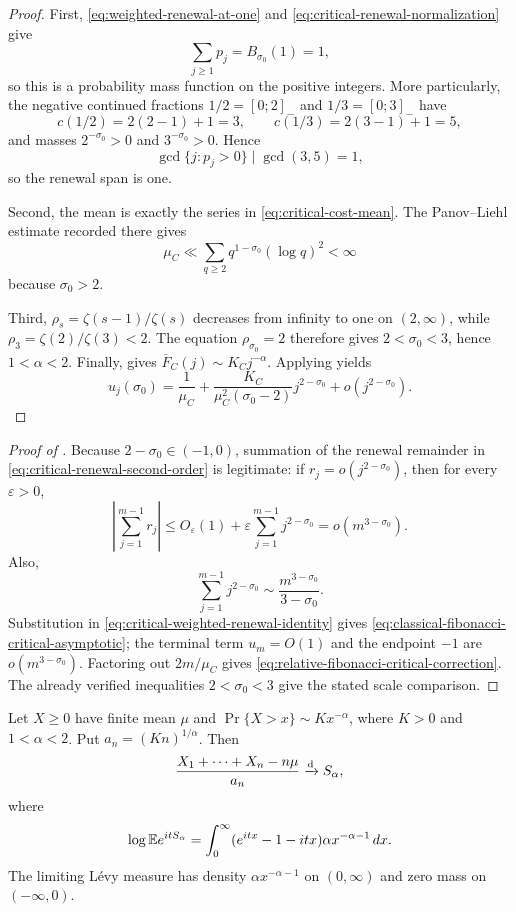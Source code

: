 \begin{proof}
First, \eqref{eq:weighted-renewal-at-one} and
\eqref{eq:critical-renewal-normalization} give
\[
 \sum_{j\ge1}p_j=B_{\sigma_0}(1)=1,
\]
so this is a probability mass function on the positive integers.  More
particularly, the negative continued fractions
\(1/2=[0;2]_-\) and \(1/3=[0;3]_-\) have
\[
 c(1/2)=2(2-1)+1=3,\qquad
 c(1/3)=2(3-1)+1=5,
\]
and masses \(2^{-\sigma_0}>0\) and \(3^{-\sigma_0}>0\).  Hence
\[
 \gcd\{j:p_j>0\}\mid\gcd(3,5)=1,
\]
so the renewal span is one.

Second, the mean is exactly the series in
\eqref{eq:critical-cost-mean}.  The Panov--Liehl estimate recorded there
gives
\[
 \mu_C\ll\sum_{q\ge2}q^{1-\sigma_0}(\log q)^2<\infty
\]
because \(\sigma_0>2\).

Third, \(\rho_s=\zeta(s-1)/\zeta(s)\) decreases from infinity to one on
\((2,\infty)\), while \(\rho_3=\zeta(2)/\zeta(3)<2\).  The equation
\(\rho_{\sigma_0}=2\) therefore gives \(2<\sigma_0<3\), hence
\(1<\alpha<2\).  Finally,  gives
\(\overline F_C(j)\sim K_Cj^{-\alpha}\).  Applying
 yields
\begin{equation}
 u_j(\sigma_0)=\frac1{\mu_C}
 +\frac{K_C}{\mu_C^2(\sigma_0-2)}j^{2-\sigma_0}
 +o(j^{2-\sigma_0}).
 \label{eq:critical-renewal-second-order}
\end{equation}
\end{proof}

\begin{proof}[Proof of ]
Because \(2-\sigma_0\in(-1,0)\), summation of the renewal remainder in
\eqref{eq:critical-renewal-second-order} is legitimate: if
\(r_j=o(j^{2-\sigma_0})\), then for every \(\varepsilon>0\),
\[
 \left|\sum_{j=1}^{m-1}r_j\right|
 \le O_\varepsilon(1)+\varepsilon
      \sum_{j=1}^{m-1}j^{2-\sigma_0}
 =o(m^{3-\sigma_0}).
\]
Also,
\[
 \sum_{j=1}^{m-1}j^{2-\sigma_0}
 \sim\frac{m^{3-\sigma_0}}{3-\sigma_0}.
\]
Substitution in \eqref{eq:critical-weighted-renewal-identity} gives
\eqref{eq:classical-fibonacci-critical-asymptotic}; the terminal term
\(u_m=O(1)\) and the endpoint \(-1\) are
\(o(m^{3-\sigma_0})\).  Factoring out \(2m/\mu_C\) gives
\eqref{eq:relative-fibonacci-critical-correction}.  The already verified
inequalities \(2<\sigma_0<3\) give the stated scale comparison.
\end{proof}

\begin{lemma}
\label{lem:one-sided-stable-domain}
Let \(X\ge0\) have finite mean \(\mu\) and
\(\Pr\{X>x\}\sim Kx^{-\alpha}\), where \(K>0\) and
\(1<\alpha<2\).  Put \(a_n=(Kn)^{1/\alpha}\).  Then
\begin{equation}
 \frac{X_1+\cdots+X_n-n\mu}{a_n}
 \xrightarrow{\rm d}S_\alpha,
 \label{eq:generic-one-sided-stable-limit}
\end{equation}
where
\[
 \log\mathbb{E} e^{itS_\alpha}
 =\int_0^\infty(e^{itx}-1-itx)\alpha x^{-\alpha-1}\,dx.
\]
The limiting L\'evy measure has density
\(\alpha x^{-\alpha-1}\) on \((0,\infty)\) and zero mass on
\(( -\infty,0)\).
\end{lemma}

